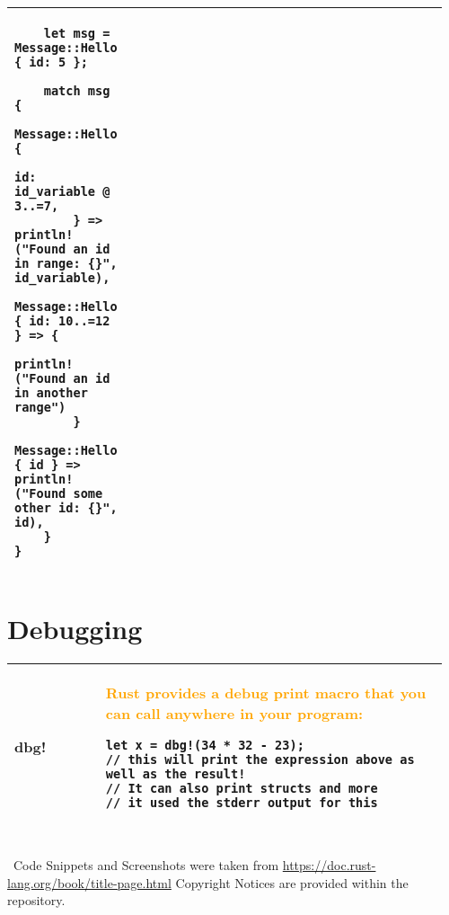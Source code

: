\documentclass[main.tex,fontsize=8pt,paper=a4,paper=portrait,DIV=calc,]{scrartcl}
\begin{document}
\begin{table}[ht!]
\begin{tabular}{|m{0.2\linewidth}|m{0.755\linewidth}|}
\begin{lstlisting}
    let msg = Message::Hello { id: 5 };

    match msg {
        Message::Hello {
            id: id_variable @ 3..=7,
        } => println!("Found an id in range: {}", id_variable),
        Message::Hello { id: 10..=12 } => {
            println!("Found an id in another range")
        }
        Message::Hello { id } => println!("Found some other id: {}", id),
    }
}
\end{lstlisting}\\
\hline

\hline

\hline

\hline

\hline

\hline

\hline

\hline

\hline
\end{tabular}
\end{table}
\pagebreak
\begin{table}[ht!]
\section{Debugging}
\begin{tabular}{|m{0.2\linewidth}|m{0.755\linewidth}|}
\hline
dbg! &
\textcolor{orange}{Rust provides a debug print macro that you can call anywhere in your program:}\newline
\begin{lstlisting}
let x = dbg!(34 * 32 - 23); 
// this will print the expression above as well as the result!
// It can also print structs and more
// it used the stderr output for this
\end{lstlisting}\\
\hline
\end{tabular}
\end{table}
\pagebreak 
\begin{table}[ht!]
\begin{tabular}{|m{0.2\linewidth}|m{0.755\linewidth}|}
\hline

\hline

\hline

\hline

\hline

\hline

\hline

\hline

\hline

\hline
\end{tabular}
\, \newline
Code Snippets and Screenshots were taken from \href{https://doc.rust-lang.org/book/title-page.html}{https://doc.rust-lang.org/book/title-page.html}\newline
Copyright Notices are provided within the repository.
\end{table}
\end{document}

